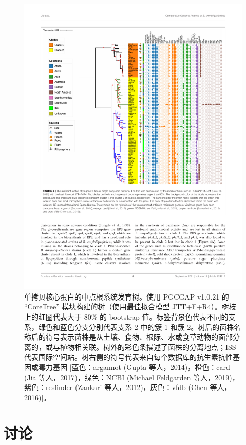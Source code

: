 \documentclass[UTF8]{ctexart}
\begin{document}
\begin{figure}[!htb]
    \centering
    \includegraphics[width=\textwidth]{figures/figure5.pdf}
    \caption{单拷贝核心蛋白的中点根系统发育树。使用 PGCGAP v1.0.21 的 ``CoreTree'' 模块构建的树（使用最佳拟合模型 JTT+F+R4）。树枝上的红圈代表大于 80\% 的 bootstrap 值。标签背景色代表不同的支系，绿色和蓝色分支分别代表支系 2 中的簇 1 和簇 2。树后的菌株名称后的符号表示菌株是从土壤、食物、根际、水或食草动物的面部分离的，或与植物相关联。树外的彩色条描述了菌株的分离地点；ISS 代表国际空间站。树右侧的符号代表来自每个数据库的抗生素抗性基因或毒力基因 [蓝色：argannot (Gupta 等人，2014)，橙色：card (Jia 等人，2017)，绿色：NCBI (Michael Feldgarden 等人，2019)，紫色：resﬁnder (Zankari 等人，2012)，灰色：vfdb (Chen 等人，2016)]。}
\end{figure}


\section{讨论}
\end{document}
